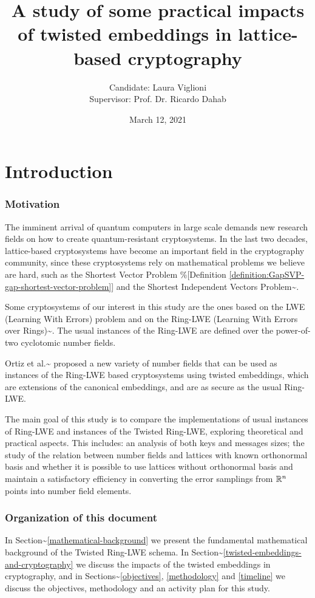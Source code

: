 \documentclass[a4paper,12pt]{article}
\author{Candidate: Laura Viglioni \\ Supervisor: Prof. Dr. Ricardo Dahab}
\date{March 12, 2021}
\title{A study of some practical impacts of twisted embeddings in lattice-based cryptography}
\begin{document}
\maketitle


\section{Introduction}
\label{sec:orgd5e6247}
\subsubsection*{Motivation}
\label{sec:org45744c6}
The imminent arrival of quantum computers in large scale demands new research fields on how to create quantum-resistant cryptosystems. In the last two decades, lattice-based cryptosystems have become an important field in the cryptography community, since these cryptosystems rely on mathematical problems we believe are hard, such as the Shortest Vector Problem \%[Definition \ref{definition:GapSVP-gap-shortest-vector-problem}]
and the Shortest Independent Vectors Problem\textasciitilde{}\cite{Peikert2017}.

Some cryptosystems of our interest in this study are the ones based on the LWE (Learning With Errors) problem 
and on the Ring-LWE (Learning With Errors over Rings)\textasciitilde{}\cite{Regev2009}.
The usual instances of the Ring-LWE are defined over the power-of-two cyclotomic number fields.

Ortiz et al.\textasciitilde{}\cite{Ortiz2021} proposed a new variety of number fields that can be used as instances of the Ring-LWE based cryptosystems using twisted embeddings,  
which are extensions of the canonical embeddings, and are as secure as the usual Ring-LWE.

The main goal of this study is to compare the implementations of usual instances of Ring-LWE and instances of the Twisted Ring-LWE, 
exploring theoretical and practical aspects.
This  includes: an analysis of both keys and messages sizes; the study of the relation between number fields and lattices with known orthonormal basis and whether it is possible to use lattices without orthonormal basis and maintain a satisfactory efficiency in converting the error samplings from \(\mathbb{R}^n\) points into number field elements.

\subsubsection*{Organization of this document}
\label{sec:orgbe146ec}
In Section\textasciitilde{}\ref{mathematical-background}  we present the fundamental mathematical background of the Twisted Ring-LWE schema. In Section\textasciitilde{}\ref{twisted-embeddings-and-cryptography} we discuss the impacts of the twisted embeddings in cryptography, and in Sections\textasciitilde{}\ref{objectives},  \ref{methodology} and \ref{timeline}  we discuss the objectives, methodology and an activity plan for this study.
\end{document}
